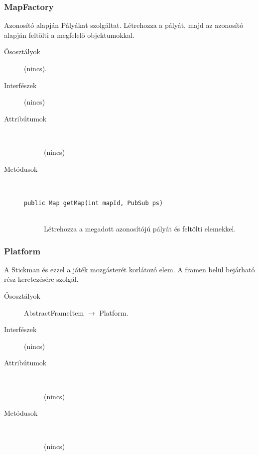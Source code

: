 		\subsubsection{MapFactory}
				 Azonosító alapján Pályákat szolgáltat.  Létrehozza a pályát, majd az azonosító alapján feltölti  a megfelelő objektumokkal. 			\begin{description}


				\item[Ősosztályok] (nincs).
				\item[Interfészek] (nincs)
				\item[Attribútumok]$\ $
					\begin{description}
						\item[] (nincs)
					\end{description}
				\item[Metódusok]$\ $
					\begin{description}
						\item[\texttt{public Map getMap(int mapId, PubSub ps)}] \hfill \\ Létrehozza a megadott azonosítójú pályát  és feltölti elemekkel. 
					\end{description}
			\end{description}

		\subsubsection{Platform}
				 A Stickman és ezzel a játék mozgásterét korlátozó elem. A framen belül bejárható rész keretezésére szolgál. 			\begin{description}


				\item[Ősosztályok] AbstractFrameItem $\rightarrow{}$ Platform.
				\item[Interfészek] (nincs)
				\item[Attribútumok]$\ $
					\begin{description}
						\item[] (nincs)
					\end{description}
				\item[Metódusok]$\ $
					\begin{description}
						\item[] (nincs)
					\end{description}
			\end{description}


